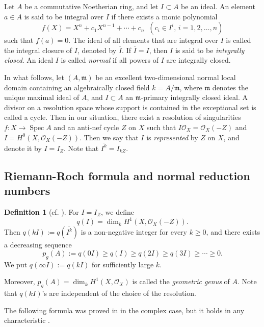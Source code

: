 \documentclass[12pt]{amsart}
\theoremstyle{definition}
\newtheorem{defn}[thm]{Definition}
\theoremstyle{remark}
\numberwithin{equation}{section}
\DeclareMathOperator{\Spec}{Spec}
\newcommand{\m}{\mathfrak m}
\renewcommand{\:}{\colon}
\begin{document}
\par 
Let $A$ be a commutative Noetherian ring, and 
let $I \subset A$ be an ideal. 
An element $a \in A$ is said to be integral over $I$ if there exists a 
monic polynomial 
\[
f(X)= X^n +c_1X^{n-1}+\cdots + c_n \;\; (c_i \in I^i,\, i=1,2,\ldots,n)
\]
such that $f(a)=0$. 
The ideal of all elements that are integral over $I$ is called the 
integral closure of $I$, denoted by $\overline{I}$. 
If $\overline{I}=I$, then $I$ is said to be {\it integrally closed}. 
An ideal $I$ is called {\it normal} if all powers of $I$ are integrally closed.  
\par 
In what follows, let $(A,\m)$ be an excellent  two-dimensional 
normal local domain containing an algebraically closed field 
$k= A/\m$, where $\m$ denotes the unique maximal ideal of $A$,
 and $I \subset A$ an $\m$-primary integrally closed ideal. 
A divisor on a resolution space whose support is contained 
in the exceptional set is called a cycle. 
Then in our situation, there exist a resolution of singularities 
$f \colon X \to \Spec A$ and an anti-nef cycle $Z$ on $X$ such that 
$I\mathcal{O}_X=\mathcal{O}_X(-Z)$ and $I=H^0(X,\mathcal{O}_X(-Z))$. 
Then we say that $I$ is \textit{represented} by $Z$ on $X$, 
and denote it by $I=I_Z$. Note that $\overline{I^k}=I_{kZ}$. 

\par \vspace{2mm}
\subsection{Riemann-Roch formula and normal reduction numbers}

\begin{defn}[\textrm{cf. \cite[Definition 2.1]{OWY4}}] \label{qkI}
For $I=I_Z$, we define 
\[
q(I) = \dim_k H^1(X,\mathcal{O}_X(-Z)). 
\]
Then $q(kI):=q(\overline{I^k})$ is a non-negative integer for every  $k \ge 0$, and 
there exists a decreasing sequence 
\[
p_g(A):=q(0 I) \ge q(I) \ge q(2I) \ge q(3I) \ge \cdots \ge 0.  
\] 
We put $q(\infty I):=q(kI)$ for sufficiently large $k$. 
\par 
Moreover, $p_g(A)=\dim_k H^1(X,\mathcal{O}_X)$ 
is called the {\it geometric genus} of $A$. 
Note that $q(kI)$'s are independent of the choice of the resolution.  
\end{defn}

\par
The following formula was proved in \cite{kato} in the complex case, but it holds in any characteristic \cite{WY}. 
\end{document}
